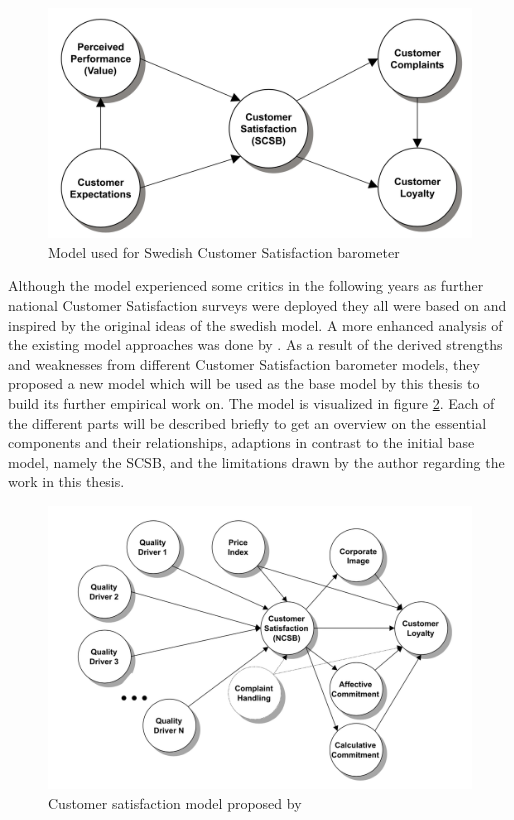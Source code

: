\begin{figure}
	\centering
	\includegraphics[width=1.0\textwidth]{img/scsb.png}
	\caption{Model used for Swedish Customer Satisfaction barometer\cite{fornell1992national}}
	\label{fig:scsb}
\end{figure} 

Although the model experienced some critics in the following years as further national Customer Satisfaction surveys were deployed they all were based on and inspired by the original ideas of the swedish model. A more enhanced analysis of the existing model approaches was done by \cite{johnson2001evolution}. As a result of the derived strengths and weaknesses from different Customer Satisfaction barometer models, they proposed a new model which will be used as the base model by this thesis to build its further empirical work on. The model is visualized in figure \ref{fig:satisfactionModel}. Each of the different parts will be described briefly to get an overview on the essential components and their relationships, adaptions in contrast to the initial base model, namely the SCSB, and the limitations drawn by the author regarding the work in this thesis. 

\begin{figure}
	\centering
	\includegraphics[width=1.0\textwidth]{img/custSatisfaction.png}
	\caption{Customer satisfaction model proposed by \cite{johnson2001evolution}}
	\label{fig:satisfactionModel}
\end{figure} 

